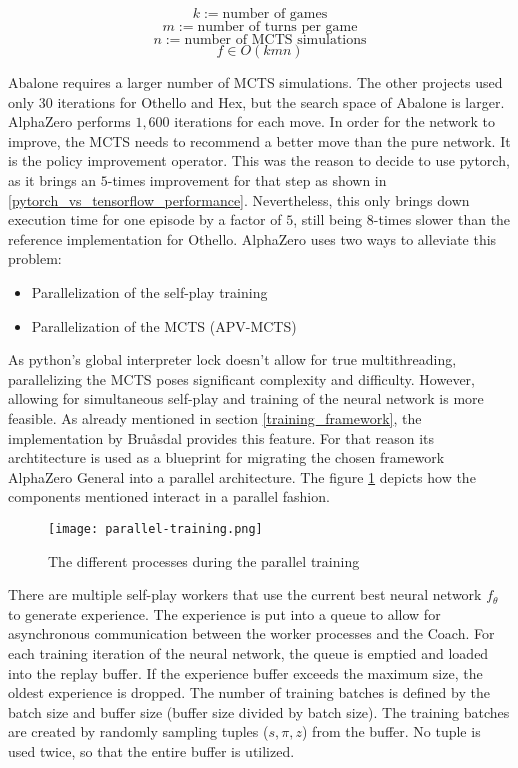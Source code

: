 $$
    k := \text{number of games}
$$
$$
    m := \text{number of turns per game}
$$
$$
    n := \text{number of MCTS simulations}
$$
$$
    f \in O(kmn)
$$

Abalone requires a larger number of MCTS simulations. The other projects \cite{bruasdal_deep_2020,thakoor_learning_nodate} used only 30 iterations for Othello and Hex, but the search space of Abalone is larger. AlphaZero performs $1,600$ iterations \cite[p. 11]{silver_mastering_2017} for each move. In order for the network to improve, the MCTS needs to recommend a better move than the pure network. It is the policy improvement operator. This was the reason to decide to use pytorch, as it brings an $5$-times improvement for that step as shown in \ref{pytorch_vs_tensorflow_performance}. Nevertheless, this only brings down execution time for one episode by a factor of $5$, still being $8$-times slower than the reference implementation for Othello. AlphaZero uses two ways to alleviate this problem:

\begin{itemize}
    \item Parallelization of the self-play training
    \item Parallelization of the MCTS (APV-MCTS)
\end{itemize}

As python's global interpreter lock \cite{noauthor_globalinterpreterlock_nodate} doesn't allow for true multithreading, parallelizing the MCTS poses significant complexity and difficulty. However, allowing for simultaneous self-play and training of the neural network is more feasible. As already mentioned in section \ref{training_framework}, the implementation by Bruåsdal \cite{bruasdal_deep_2020} provides this feature. For that reason its archtitecture is used as a blueprint for migrating the chosen framework AlphaZero General into a parallel architecture. The figure \ref{parallel_training_pipeline} depicts how the components mentioned interact in a parallel fashion.

\begin{figure}[H]
    \centering
    \texttt{[image: parallel-training.png]}
    \caption{The different processes during the parallel training \cite[cf. p. 45]{bruasdal_deep_2020}}
    \label{parallel_training_pipeline}
\end{figure}

There are multiple self-play workers that use the current best neural network $f_{\theta}$ to generate experience. The experience is put into a queue to allow for asynchronous communication between the worker processes and the Coach. For each training iteration of the neural network, the queue is emptied and loaded into the replay buffer. If the experience buffer exceeds the maximum size, the oldest experience is dropped. The number of training batches is defined by the batch size and buffer size (buffer size divided by batch size). The training batches are created by randomly sampling tuples ($s, \pi, z$) from the buffer. No tuple is used twice, so that the entire buffer is utilized.

